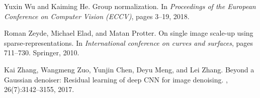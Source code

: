 \documentclass[10pt,twocolumn,letterpaper]{article}
\begin{document}
{\begin{thebibliography}{10}
	Yuxin Wu and Kaiming He.
	\newblock Group normalization.
	\newblock In {\em Proceedings of the European Conference on Computer Vision
		(ECCV)}, pages 3--19, 2018.
	
	Roman Zeyde, Michael Elad, and Matan Protter.
	\newblock On single image scale-up using sparse-representations.
	\newblock In {\em International conference on curves and surfaces}, pages
	711--730. Springer, 2010.
	
	Kai Zhang, Wangmeng Zuo, Yunjin Chen, Deyu Meng, and Lei Zhang.
	\newblock Beyond a {Gaussian} denoiser: Residual learning of deep {CNN} for
	image denoising.
	, 26(7):3142--3155, 2017.
	
\end{thebibliography}

}
\end{document}
